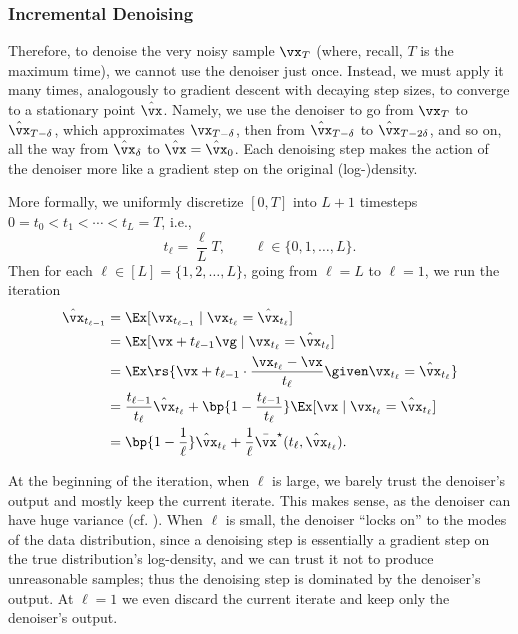 \documentclass[../../book-main.tex]{subfiles}
\begin{document}
\subsubsection{Incremental Denoising}
Therefore, to denoise the very noisy sample \(\vx_{T}\) (where,
recall, \(T\) is the maximum time), we cannot use the denoiser just
once. Instead, we must apply it many times, analogously to gradient
descent with decaying step sizes, to converge to a stationary point
\(\hat{\vx}\). Namely, we use the denoiser to go from \(\vx_{T}\) to
\(\hat{\vx}_{T - \delta}\), which approximates \(\vx_{T - \delta}\),
then from \(\hat{\vx}_{T - \delta}\) to \(\hat{\vx}_{T - 2\delta}\),
and so on, all the way from \(\hat{\vx}_{\delta}\) to \(\hat{\vx} =
\hat{\vx}_{0}\). Each denoising step makes the action of the denoiser
more like a gradient step on the original (log-)density.

More formally, we uniformly discretize \([0, T]\) into \(L + 1\)
timesteps \(0 = t_{0} < t_{1} < \cdots < t_{L} = T\), i.e.,
\begin{equation}
    t_{\ell} = \frac{\ell}{L}T, \qquad \ell \in \{0, 1, \dots, L\}.
\end{equation}
Then for each \(\ell \in [L] = \{1, 2, \dots, L\}\), going from
\(\ell = L\) to \(\ell = 1\), we run the iteration
\begin{align}
    \hat{\vx}_{t_{\ell - 1}}
    &= \Ex[\vx_{t_{\ell - 1}} \mid \vx_{t_{\ell}} = \hat{\vx}_{t_{\ell}}] \\
    &= \Ex[\vx + t_{\ell - 1}\vg \mid \vx_{t_{\ell}} = \hat{\vx}_{t_{\ell}}] \\
    &= \Ex\rs{\vx + t_{\ell - 1}\cdot\frac{\vx_{t_{\ell}} -
    \vx}{t_{\ell}} \given \vx_{t_{\ell}} = \hat{\vx}_{t_{\ell}}} \\
    &= \frac{t_{\ell - 1}}{t_{\ell}}\hat{\vx}_{t_{\ell}} + \bp{1 -
    \frac{t_{\ell - 1}}{t_{\ell}}}\Ex[\vx \mid \vx_{t_{\ell}} =
    \hat{\vx}_{t_{\ell}}] \\
    &= \bp{1 - \frac{1}{\ell}} \hat{\vx}_{t_{\ell}} + \frac{1}{\ell}
    \bar{\vx}^{\star}(t_{\ell}, \hat{\vx}_{t_{\ell}}). \label{eq:iter denoise}
\end{align}

At the beginning of the iteration, when \(\ell\) is large, we barely
trust the denoiser's output and mostly keep the current iterate.
This makes sense, as the denoiser can have huge variance (cf.
). When \(\ell\) is small, the
denoiser ``locks on'' to the modes of the data distribution, since a
denoising step is essentially a gradient step on the true
distribution's log-density, and we can trust it not to produce
unreasonable samples; thus the denoising step is dominated by the
denoiser's output. At \(\ell = 1\) we even discard the
current iterate and keep only the denoiser's output.
\end{document}
